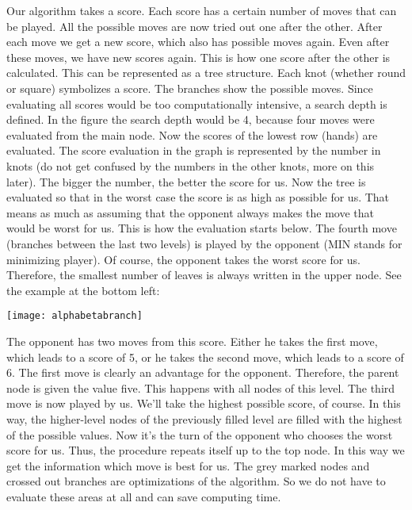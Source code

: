Our algorithm takes a score. Each score has a certain number of moves that can be played. All the possible moves are now tried out one after the other. After each move we get a new score, which also has possible moves again. Even after these moves, we have new scores again. This is how one score after the other is calculated. This can be represented as a tree structure. Each knot (whether round or square) symbolizes a score. The branches show the possible moves. Since evaluating all scores would be too computationally intensive, a search depth is defined. In the figure the search depth would be 4, because four moves were evaluated from the main node. Now the scores of the lowest row (hands) are evaluated. The score evaluation in the graph is represented by the number in knots (do not get confused by the numbers in the other knots, more on this later). The bigger the number, the better the score for us. Now the tree is evaluated so that in the worst case the score is as high as possible for us. That means as much as assuming that the opponent always makes the move that would be worst for us. This is how the evaluation starts below. The fourth move (branches between the last two levels) is played by the opponent (MIN stands for minimizing player). Of course, the opponent takes the worst score for us. Therefore, the smallest number of leaves is always written in the upper node. See the example at the bottom left:
\begin{fixedpic}
	\centering
	\texttt{[image: alphabetabranch]}
\end{fixedpic}
The opponent has two moves from this score. Either he takes the first move, which leads to a score of 5, or he takes the second move, which leads to a score of 6. The first move is clearly an advantage for the opponent. Therefore, the parent node is given the value five. This happens with all nodes of this level. The third move is now played by us. We'll take the highest possible score, of course. In this way, the higher-level nodes of the previously filled level are filled with the highest of the possible values. Now it's the turn of the opponent who chooses the worst score for us. Thus, the procedure repeats itself up to the top node. In this way we get the information which move is best for us. The grey marked nodes and crossed out branches are optimizations of the algorithm. So we do not have to evaluate these areas at all and can save computing time.

